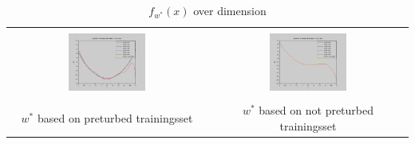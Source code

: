 \documentclass[]{report}
\begin{document}
\begin{table}[h]
\begin{tabular}{| c | c |}
\hline
 & \\
\includegraphics[width=0.4\textwidth]{./images/f_x_w_star_overDimensions.png} & \includegraphics[width=0.4\textwidth]{./images/f_x_w_star_not_preturbed_overDimensions.png} \\
 & \\
$w^*$ based on preturbed trainingsset & $w^*$ based on not preturbed trainingsset \\
\hline
\end{tabular}
\caption{$f_{w^*}(x)$ over dimension}
\label{tab:f_x_overDimension}
\end{table}
\end{document}
